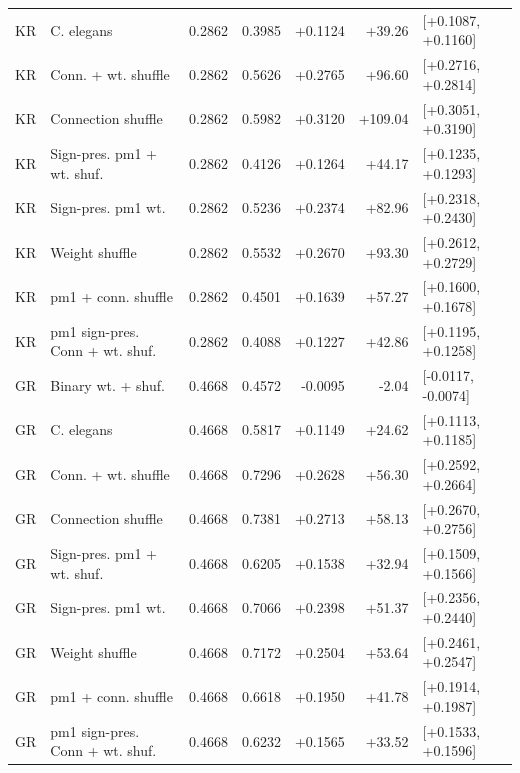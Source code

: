 \begin{tabular}{llrrrrl}
KR & C. elegans & 0.2862 & 0.3985 & +0.1124 & +39.26 & [+0.1087, +0.1160] \\
KR & Conn. + wt. shuffle & 0.2862 & 0.5626 & +0.2765 & +96.60 & [+0.2716, +0.2814] \\
KR & Connection shuffle & 0.2862 & 0.5982 & +0.3120 & +109.04 & [+0.3051, +0.3190] \\
KR & Sign-pres. pm1 + wt. shuf. & 0.2862 & 0.4126 & +0.1264 & +44.17 & [+0.1235, +0.1293] \\
KR & Sign-pres. pm1 wt. & 0.2862 & 0.5236 & +0.2374 & +82.96 & [+0.2318, +0.2430] \\
KR & Weight shuffle & 0.2862 & 0.5532 & +0.2670 & +93.30 & [+0.2612, +0.2729] \\
KR & pm1 + conn. shuffle & 0.2862 & 0.4501 & +0.1639 & +57.27 & [+0.1600, +0.1678] \\
KR & pm1 sign-pres. Conn + wt. shuf. & 0.2862 & 0.4088 & +0.1227 & +42.86 & [+0.1195, +0.1258] \\
GR & Binary wt. + shuf. & 0.4668 & 0.4572 & -0.0095 & -2.04 & [-0.0117, -0.0074] \\
GR & C. elegans & 0.4668 & 0.5817 & +0.1149 & +24.62 & [+0.1113, +0.1185] \\
GR & Conn. + wt. shuffle & 0.4668 & 0.7296 & +0.2628 & +56.30 & [+0.2592, +0.2664] \\
GR & Connection shuffle & 0.4668 & 0.7381 & +0.2713 & +58.13 & [+0.2670, +0.2756] \\
GR & Sign-pres. pm1 + wt. shuf. & 0.4668 & 0.6205 & +0.1538 & +32.94 & [+0.1509, +0.1566] \\
GR & Sign-pres. pm1 wt. & 0.4668 & 0.7066 & +0.2398 & +51.37 & [+0.2356, +0.2440] \\
GR & Weight shuffle & 0.4668 & 0.7172 & +0.2504 & +53.64 & [+0.2461, +0.2547] \\
GR & pm1 + conn. shuffle & 0.4668 & 0.6618 & +0.1950 & +41.78 & [+0.1914, +0.1987] \\
GR & pm1 sign-pres. Conn + wt. shuf. & 0.4668 & 0.6232 & +0.1565 & +33.52 & [+0.1533, +0.1596] \\
\bottomrule
\end{tabular}
